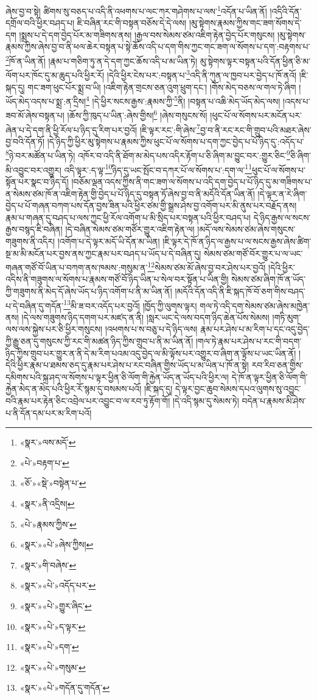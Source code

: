 ཞེས་བྱ་བ་སྟེ། ཚིགས་སུ་བཅད་པ་འདི་ནི་འཕགས་པ་ལང་ཀར་གཤེགས་པ་ལས་\footnote{«སྣར་»ལས་མདོ་}འདོན་པ་ཡིན་ནོ། །འདིའི་དོན་དགྲོལ་བའི་ཕྱིར་བཤད་པ། ཇི་བཞིན་རང་གི་བསྟན་བཅོས་དེ་དེ་ལས། །མུ་སྟེགས་རྣམས་ཀྱིས་གང་ཟག་སོགས་དེ་དག །སྨྲས་པ་དེ་དག་བྱེད་པོར་མ་གཟིགས་ནས། །རྒྱལ་བས་སེམས་ཙམ་འཇིག་རྟེན་བྱེད་པོར་གསུངས། །མུ་སྟེགས་རྣམས་ཀྱིས་ཞེས་བྱ་བ་ནི་ཕལ་ཆེར་བསྟན་པ་སྟེ་ཆོས་འདི་པ་དག་གིས་ཀྱང་གང་ཟག་ལ་སོགས་པ་དག་:བརྟགས་པ་\footnote{«པེ་»བརྟག་པ་}ཁོ་ན་ཡིན་ནོ། །རྣམ་པ་གཅིག་ཏུ་ན་དེ་དག་ཀྱང་ཆོས་འདི་པ་མ་ཡིན་ཏེ། མུ་སྟེགས་ལྟར་བསྟན་པའི་དོན་ཕྱིན་ཅི་མ་ལོག་པར་ཁོང་དུ་མ་ཆུད་པའི་ཕྱིར་རོ། །དེའི་ཕྱིར་ངེས་པར་:བསྟན་པ་\footnote{«ཅོ་»«སྡེ་»བསྟེན་པ་}འདི་ནི་ཀུན་ལ་ཁྱབ་པར་བྱེད་པ་ཁོ་ནའོ། །ཇི་སྐད་དུ། གང་ཟག་ཕུང་པོར་སྨྲ་བ་ཡི། །འཇིག་རྟེན་གྲངས་ཅན་འུག་ཕྲུག་དང་། །གོས་མེད་བཅས་ལ་གལ་ཏེ་ཞིག །ཡོད་མེད་འདས་པ་སྨྲ་:ན་དྲིས།\footnote{«སྣར་»ནི་འདྲིས།} །དེ་ཕྱིར་སངས་རྒྱས་:རྣམས་ཀྱི་\footnote{«པེ་»རྣམས་ཀྱིས་}ནི། །བསྟན་པ་འཆི་མེད་ཡོད་མེད་ལས། །འདས་པ་ཟབ་མོ་ཞེས་བསྟན་པ། །ཆོས་ཀྱི་ཁུད་པ་ཡིན་:ཞེས་གྱིས།\footnote{«སྣར་»«པེ་»ཞེས་ཀྱིས།} །ཞེས་གསུངས་སོ། །ཕུང་པོ་ལ་སོགས་པར་མངོན་པར་ཞེན་པ་དེ་དག་ནི་ཕྱི་རོལ་པ་ཉིད་དུ་རིག་པར་བྱའོ། །ཇི་ལྟར་རང་:གི་ཞེས་\footnote{«སྣར་»གི་བཞེས་}བྱ་བ་ནི་རང་རང་གི་གྲུབ་པའི་མཐར་ཞེས་བྱ་བའི་དོན་ཏོ། །དེ་ཉིད་ཀྱི་ཕྱིར་མུ་སྟེགས་པ་རྣམས་ཀྱིས་ཕུང་པོ་ལ་སོགས་པ་དག་ཀྱང་བྱེད་པ་པོ་ཉིད་དུ་:འདོད་པ་\footnote{«སྣར་»«པེ་»འདོད་པར་}ཉེ་བར་མཚོན་པ་ཡིན་ཏེ། འཁོར་བ་འདི་ནི་ཐོག་མ་མེད་པས་འདིར་རྟོག་པ་ཅི་ཞིག་མ་བྱུང་བར་:གྱུར་ཅིང་\footnote{«སྣར་»«པེ་»གྱུར་ཞིང་}ཅི་ཞིག་མི་འབྱུང་བར་འགྱུར། འདི་ལྟར་:ད་ལྟ་\footnote{«སྣར་»«པེ་»ད་ལྟར་}ཉིད་དུ་ཡང་སྤོང་བ་དཀར་པོ་ལ་སོགས་པ་:དག་ལ་\footnote{«སྣར་»«པེ་»དག་}ཕུང་པོ་ལ་སོགས་པ་སྟོན་པར་སྣང་བ་ཉིད་དོ། །བཅོམ་ལྡན་འདས་ཀྱིས་ནི་གང་ཟག་ལ་སོགས་པ་འདི་དག་བྱེད་པ་པོ་ཉིད་དུ་མ་གཟིགས་པ་ན་སེམས་ཙམ་ཁོ་ན་འཇིག་རྟེན་གྱི་བྱེད་པ་པོ་ཉིད་དུ་བསྟན་ཏོ་ཞེས་བྱ་བ་ནི་མདོའི་དོན་ཡིན་ནོ། །དེ་ལྟར་ན་རེ་ཞིག་བྱེད་པ་པོ་གཞན་བཀག་པས་དོན་བྱས་ཟིན་པའི་ཕྱིར་ཙམ་གྱི་སྒྲས་ཤེས་བྱ་འགོག་པར་མི་ནུས་པར་བརྗོད་ནས། རྣམ་པ་གཞན་དུ་བཤད་པ་ལས་ཀྱང་ཕྱི་རོལ་འགོག་པ་མི་སྲིད་པར་བསྟན་པའི་ཕྱིར་བཤད་པ། དེ་ཉིད་རྒྱས་ལ་སངས་རྒྱས་བསྙད་ཇི་བཞིན། །དེ་བཞིན་སེམས་ཙམ་གཙོར་གྱུར་འཇིག་རྟེན་ལ། །མདོ་ལས་སེམས་ཙམ་ཞེས་གསུངས་གཟུགས་ནི་འདིར། །འགོག་པ་དེ་ལྟར་མདོ་ཡི་དོན་མ་ཡིན། །ཇི་ལྟར་དེ་ཁོ་ན་ཉིད་ལ་རྒྱས་པ་ལ་སངས་རྒྱས་ཞེས་ཚིག་སྔ་མ་མི་མངོན་པར་བྱས་ནས་ཀྱང་རྣམ་པར་བཤད་པ་ཡོད་པ་དེ་བཞིན་དུ། སེམས་ཙམ་གཙོ་བོར་གྱུར་པ་ལ་ཡང་གཞན་གཙོ་བོ་ཡིན་པ་བཀག་ནས་ཁམས་:གསུམ་ན་\footnote{«སྣར་»«པེ་»གསུམ་}སེམས་ཙམ་མོ་ཞེས་བྱ་བར་ཤེས་པར་བྱའོ། །དེའི་ཕྱིར་འདིས་ནི་གཟུགས་ལ་སོགས་པ་རྣམས་གཙོ་བོ་ཉིད་ཡིན་པ་སེལ་བར་སྟོན་པ་ཡིན་གྱི། སེམས་ཙམ་ཞིག་ཁོ་ན་ཡོད་ཀྱི་གཟུགས་ནི་མེད་དོ་ཞེས་ཡོད་པ་ཉིད་འགོག་པ་ནི་མ་ཡིན་ནོ། །མདོའི་དོན་འདི་ནི་ཇི་སྐད་ཁོ་བོ་ཅག་གིས་བཤད་པ་དེ་བཞིན་དུ་གདོན་\footnote{«སྣར་»«པེ་»གདོན་དུ་གདོན་}མི་ཟ་བར་འདོད་པར་བྱའོ། །ཁྱོད་ཀྱི་ལུགས་ལྟར། གལ་ཏེ་འདི་དག་སེམས་ཙམ་ཞེས་མཁྱེན་ནས། །དེ་ལས་གཟུགས་ཉིད་དགག་པར་མཛད་ན་ནི། །སླར་ཡང་དེ་ལས་བདག་ཉིད་ཆེན་པོས་སེམས། །གཏི་མུག་ལས་ལས་སྐྱེས་པར་ཅི་ཕྱིར་གསུངས། །འཕགས་པ་ས་བཅུ་པ་དེ་ཉིད་ལས། རྣམ་པར་ཤེས་པ་མ་རིག་པ་དང་འདུ་བྱེད་ཀྱི་རྒྱུ་ཅན་དུ་གསུངས་ཀྱི་རང་གི་མཚན་ཉིད་ཀྱིས་གྲུབ་པ་ནི་མ་ཡིན་ནོ། །གལ་ཏེ་རྣམ་པར་ཤེས་པ་རང་གི་བདག་ཉིད་ཀྱིས་གྲུབ་པར་གྱུར་ན་ནི་དེ་མ་རིག་པའམ་འདུ་བྱེད་ལ་མི་ལྟོས་པར་འགྱུར་བ་ཞིག་ན་ལྟོས་པ་ཡང་ཡིན་ནོ། །དེའི་ཕྱིར་རྣམ་པ་ཐམས་ཅད་དུ་རྣམ་པར་ཤེས་པ་རང་བཞིན་གྱིས་ཡོད་པ་མ་ཡིན་པ་ཁོ་ན་སྟེ། རབ་རིབ་ཅན་གྱིས་དམིགས་པའི་སྐྲ་ཤད་ལ་སོགས་པ་ལྟར་ཕྱིན་ཅི་ལོག་གི་རྐྱེན་ཡོད་ན་ཡོད་པའི་ཕྱིར་ལ། དེ་ཁོ་ན་ལྟར་ཕྱིན་ཅི་ལོག་གི་རྐྱེན་མེད་ན་མེད་པའི་ཕྱིར་རོ་སྙམ་དུ་བསམས་པའོ། །ཇི་སྐད་དུ། དེ་ལྟར་བྱང་ཆུབ་སེམས་དཔའ་ལུགས་སུ་འབྱུང་བའི་རྣམ་པར་རྟེན་ཅིང་འབྲེལ་པར་འབྱུང་བ་ལ་རབ་ཏུ་རྟོག་གོ། །དེ་འདི་སྙམ་དུ་སེམས་ཏེ། བདེན་པ་རྣམས་མི་ཤེས་པ་ནི་དོན་དམ་པར་མ་རིག་པའོ། 